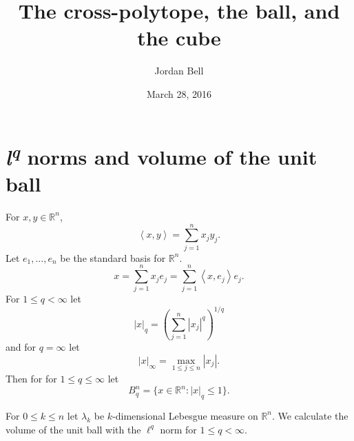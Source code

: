 \documentclass{article}
\newcommand{\inner}[2]{\left\langle #1, #2 \right\rangle}
\theoremstyle{definition}
\theoremstyle{definition}
\begin{document}
\title{The cross-polytope, the ball, and the cube}
\author{Jordan Bell}
\date{March 28, 2016}

\maketitle

\section{{\em l\textsuperscript{q}} norms and volume of the unit ball}
For $x,y \in \mathbb{R}^n$,
\[
\inner{x}{y} = \sum_{j=1}^n x_j y_j.
\]
Let $e_1,\ldots,e_n$ be the standard basis for $\mathbb{R}^n$. 
\[
x = \sum_{j=1}^n x_j e_j = \sum_{j=1}^n \inner{x}{e_j} e_j.
\]
For $1 \leq q < \infty$ let
\[
|x|_q = \left( \sum_{j=1}^n |x_j|^q \right)^{1/q}
\]
and for $q=\infty$ let
\[
|x|_\infty = \max_{1 \leq j \leq n} |x_j|.
\]
Then for
for $1 \leq  q \leq \infty$ let
\[
B_q^n = \{x \in \mathbb{R}^n: |x|_q \leq 1\}.
\]

For $0 \leq k \leq n$ let $\lambda_k$ be $k$-dimensional Lebesgue measure on $\mathbb{R}^n$.
We calculate the volume of the unit ball with the $\ell^q$ norm for $1 \leq q<\infty$.
\end{document}
